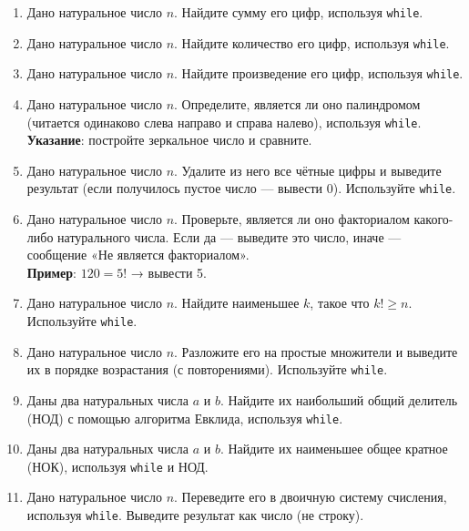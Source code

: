\documentclass[12pt]{article}
\begin{document}
\begin{enumerate}
    \item Дано натуральное число $n$. Найдите сумму его цифр, используя \texttt{while}.

    \item Дано натуральное число $n$. Найдите количество его цифр, используя \texttt{while}.

    \item Дано натуральное число $n$. Найдите произведение его цифр, используя \texttt{while}.

    \item Дано натуральное число $n$. Определите, является ли оно палиндромом (читается одинаково слева направо и справа налево), используя \texttt{while}. \\
    \textbf{Указание}: постройте зеркальное число и сравните.

    \item Дано натуральное число $n$. Удалите из него все чётные цифры и выведите результат (если получилось пустое число — вывести 0). Используйте \texttt{while}.

    \item Дано натуральное число $n$. Проверьте, является ли оно факториалом какого-либо натурального числа. Если да — выведите это число, иначе — сообщение «Не является факториалом». \\
    \textbf{Пример}: $120 = 5!$ → вывести 5.

    \item Дано натуральное число $n$. Найдите наименьшее $k$, такое что $k! \geqslant n$. Используйте \texttt{while}.

    \item Дано натуральное число $n$. Разложите его на простые множители и выведите их в порядке возрастания (с повторениями). Используйте \texttt{while}.

    \item Даны два натуральных числа $a$ и $b$. Найдите их наибольший общий делитель (НОД) с помощью алгоритма Евклида, используя \texttt{while}.

    \item Даны два натуральных числа $a$ и $b$. Найдите их наименьшее общее кратное (НОК), используя \texttt{while} и НОД.

    \item Дано натуральное число $n$. Переведите его в двоичную систему счисления, используя \texttt{while}. Выведите результат как число (не строку).


\end{enumerate}
\end{document}
